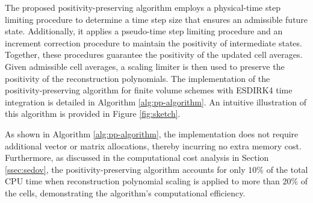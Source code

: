 The proposed positivity-preserving algorithm employs a physical-time step limiting procedure to determine a time step size that ensures an admissible future state. Additionally, it applies a pseudo-time step limiting procedure and an increment correction procedure to maintain the positivity of intermediate states. Together, these procedures guarantee the positivity of the updated cell averages. Given admissible cell averages, a scaling limiter is then used to preserve the positivity of the reconstruction polynomials.
The implementation of the positivity-preserving algorithm for finite volume schemes with ESDIRK4 time integration is detailed in Algorithm \ref{alg:pp-algorithm}. An intuitive illustration of this algorithm is provided in Figure \ref{fig:sketch}.

As shown in Algorithm \ref{alg:pp-algorithm}, the implementation does not require additional vector or matrix allocations, thereby incurring no extra memory cost. Furthermore, as discussed in the computational cost analysis in Section \ref{ssec:sedov}, the positivity-preserving algorithm accounts for only $10\%$ of the total CPU time when reconstruction polynomial scaling is applied to more than $20\%$ of the cells, demonstrating the algorithm’s computational efficiency.






